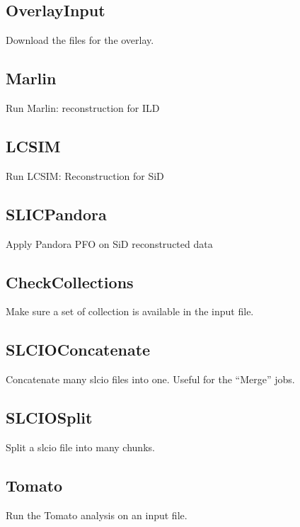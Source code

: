 \documentclass[a4paper,12pt]{article}
\begin{document}
\subsection{OverlayInput}\label{overlay}
Download the files for the overlay.

\subsection{Marlin}\label{marlin}
Run Marlin: reconstruction for ILD

\subsection{LCSIM}\label{lcsim}
Run LCSIM: Reconstruction for SiD

\subsection{SLICPandora}\label{slicpan}
Apply Pandora PFO on SiD reconstructed data

\subsection{CheckCollections}\label{checkcoll}
Make sure a set of collection is available in the input file.

\subsection{SLCIOConcatenate}\label{slcioconcat}
Concatenate many slcio files into one. Useful for the ``Merge'' jobs. 

\subsection{SLCIOSplit}\label{slciosplit}
Split a slcio file into many chunks. 

\subsection{Tomato}\label{tomato}
Run the Tomato analysis on an input file.
\end{document}
